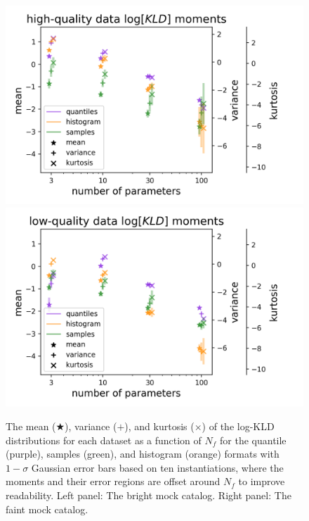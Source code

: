 \documentclass[\docopts]{\docclass}
\newcommand{\mgdata}{bright\xspace}
\newcommand{\ssdata}{faint\xspace}
\begin{document}
\begin{figure}
  \begin{center}
    \includegraphics[width=\columnwidth]{graham_pz_kld.pdf}
    \includegraphics[width=\columnwidth]{schmidt_pz_kld.pdf}
    \caption{
    The mean ($\bigstar$), variance ($+$), and kurtosis ($\times$) of the 
log-KLD distributions for each dataset as a function of $N_{f}$ for the 
quantile (purple), samples (green), and histogram (orange) formats with 
$1-\sigma$ Gaussian error bars based on ten instantiations, where the moments 
and their error regions are offset around $N_{f}$ to improve readability.
    Left panel: The \mgdata mock catalog.
    Right panel: The \ssdata mock catalog.
    \label{fig:moments}}
  \end{center}
\end{figure}
\end{document}
